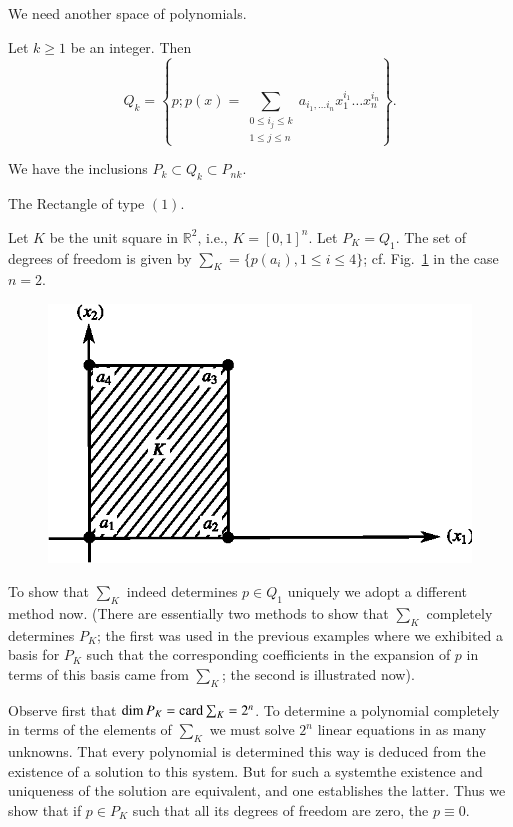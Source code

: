 We need another space of polynomials.

\begin{definition}\label{chap4-defi4.4}
Let $k\geq 1$ be an integer. Then 
$$
Q_{k}=\left\{p;p(x)=\sum_{\substack{0\leq i_{j}\leq k\\ 1\leq j\leq
    n}}a_{i_{1},\ldots i_{n}}x^{i_{1}}_{1}\ldots x^{i_{n}}_{n}\right\}.
$$\pageoriginale
\end{definition}

We have the inclusions $P_{k}\subset Q_{k}\subset P_{nk}$.

\begin{example}\label{chap4-exam4.4}
The Rectangle of type $(1)$.

Let $K$ be the unit square in $\mathbb{R}^{2}$, i.e.,
$K=[0,1]^{n}$. Let $P_{K}=Q_{1}$. The set of degrees of freedom is
given by $\sum_{K}=\{p(a_{i}),1\leq i\leq 4\}$;
cf. Fig.~\ref{chap4-fig4.4} in the case $n=2$. 
\begin{figure}[H]
\centering
\includegraphics{figure/fig4.4.eps}
\caption{}\label{chap4-fig4.4}
\end{figure}

To show that $\sum_{K}$ indeed determines $p\in Q_{1}$ uniquely we
adopt a different method now. (There are essentially two methods to
show that $\sum_{K}$ completely determines $P_{K}$; the first was used
in the previous examples where we exhibited a basis for $P_{K}$ such
that the corresponding coefficients in the expansion of $p$ in terms
of this basis came from $\sum_{K}$; the second is illustrated now).

Observe first that $\dim P_{K}=\operatorname{card} \sum_{K}=2^{n}$. To determine a
polynomial completely in terms of the elements of $\sum_{K}$ we must
solve $2^{n}$ linear equations in as many unknowns. That every
polynomial is determined this way is deduced from the existence of a
solution to this system. But for such a system\pageoriginale the
existence and uniqueness of the solution are equivalent, and one
establishes the latter. Thus we show that if $p\in P_{K}$ such that
all its degrees of freedom are zero, the $p\equiv 0$.


\end{example}

